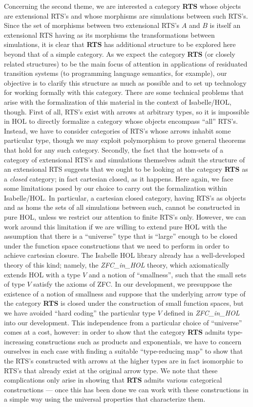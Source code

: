 \documentclass[11pt,notitlepage,a4paper]{report}
\begin{document}
Concerning the second theme, we are interested a category {\bf RTS} whose objects are
extensional RTS's and whose morphisms are simulations between such RTS's.
Since the set of morphisms between two extensional RTS's $A$ and $B$ is itself an extensional
RTS having as its morphisms the transformations between simulations, it is clear that
{\bf RTS} has additional structure to be explored here beyond that of a simple category.
As we expect the category {\bf RTS} (or closely related structures) to be the main focus
of attention in applications of residuated transition systems (to programming language
semantics, for example), our objective is to clarify this structure as much as possible and
to set up technology for working formally with this category.
There are some technical problems that arise with the formalization of this material in
the context of Isabelle/HOL, though.  First of all, RTS's exist with arrows at arbitrary types,
so it is impossible in HOL to directly formalize a category whose objects encompass
``all'' RTS's.  Instead, we have to consider categories of RTS's whose arrows inhabit
some particular type, though we may exploit polymorphism to prove general theorems that hold
for any such category.  Secondly, the fact that the hom-sets of a category of extensional RTS's
and simulations themselves admit the structure of an extensional RTS suggests that we ought
to be looking at the category {\bf RTS} as a {\em closed} category;
in fact cartesian closed, as it happens.  Here again, we face some limitations posed by our
choice to carry out the formalization within Isabelle/HOL.  In particular, a cartesian
closed category, having RTS's as objects and as homs the sets of all simulations between such,
cannot be constructed in pure HOL, unless we restrict our attention to finite RTS's only.
However, we can work around this limitation if we are willing to extend pure HOL with the
assumption that there is a ``universe'' type that is ``large'' enough to be closed under the
function space constructions that we need to perform in order to achieve cartesian closure.
The Isabelle HOL library already has a well-developed theory of this kind; namely, the
{\em ZFC\_in\_HOL} theory, which axiomatically extends HOL with a type $V$ and a notion of
``smallness'', such that the small sets of type $V$ satisfy the axioms of ZFC.
In our development, we presuppose the existence of a notion of smallness and suppose that
the underlying arrow type of the category {\bf RTS} is closed under the construction of
small function spaces, but we have avoided ``hard coding'' the particular type $V$ defined
in {\em ZFC\_in\_HOL} into our development.  This independence from a particular
choice of ``universe'' comes at a cost, however: in order to show that the category
{\bf RTS} admits type-increasing constructions such as products and exponentials,
we have to concern ourselves in each case with finding a suitable ``type-reducing map''
to show that the RTS's constructed with arrows at the higher types are in fact isomorphic
to RTS's that already exist at the original arrow type.  We note that these complications
only arise in showing that {\bf RTS} admits various categorical constructions --- once this
has been done we can work with these constructions in a simple way using the universal
properties that characterize them.
\end{document}
